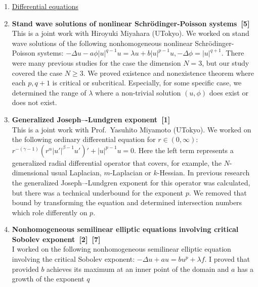 \documentclass[a4j,twocolumn]{jarticle}
\begin{document}

\begin{enumerate}
 \item[] \underline{Differential equations}
 \item {\bf Stand wave solutions of
       nonlinear Schr\"{o}dinger-Poisson systems~[5]} \\
       This is a joint work with Hiroyuki Miyahara (UTokyo).
       We worked on stand wave solutions
       of the following nonhomogeneous
       nonlinear Schr\"{o}dinger-Poisson systems:
       $-\Delta u -a \phi \left\lvert u \right\rvert^{q-1} u = \lambda u
       + b \left\lvert u \right\rvert^{p-1} u, -\Delta \phi =
       \left\lvert u \right\rvert^{q+1}$.
       There were many previous studies for the case the dimension $N = 3$,
       but our study covered the case $N \geq 3$.
       We proved existence and nonexistence theorem
       where each $p, q+1$ is critical or subcritical.
       Especially, for some specific case,
       we determined the range of $\lambda$ where a non-trivial solution
       $(u, \phi)$ does exist or does not exist.
 \item {\bf Generalized Joseph–-Lundgren exponent~[1]} \\
       This is a joint work with Prof.~Yasuhito Miyamoto (UTokyo).
       We worked on the following ordinary differential equation for $r
       \in (0, \infty)$:
       $r^{-(\gamma-1)} (r^\alpha \lvert u' \rvert^{\beta -1 } u')'
       + \lvert u \rvert^{p-1} u = 0$.
       Here the left term represents
       a generalized radial differential operator
       that covers, for example, the $N$-dimensional
       usual Laplacian, $m$-Laplacian or $k$-Hessian.
       In previous research
       the generalized Joseph–-Lundgren exponent for this operator
       was calculated, but there was a technical underbound for
       the exponent $p$.
       We removed that bound by transforming the equation
       and determined intersection numbers
       which role differently on $p$.
 \item {\bf Nonhomogeneous semilinear elliptic equations involving
       critical Sobolev exponent~[2]~[7]} \\
       I worked on the following
       nonhomogeneous semilinear elliptic equation
       involving the critical Sobolev exponent:
       $-\Delta u + a u = b u^p + \lambda f$.
       I proved that provided 
       $b$ achieves its maximum at an inner point of the
       domain and $a$ has a growth of the exponent $q$

\end{enumerate}
\end{document}
